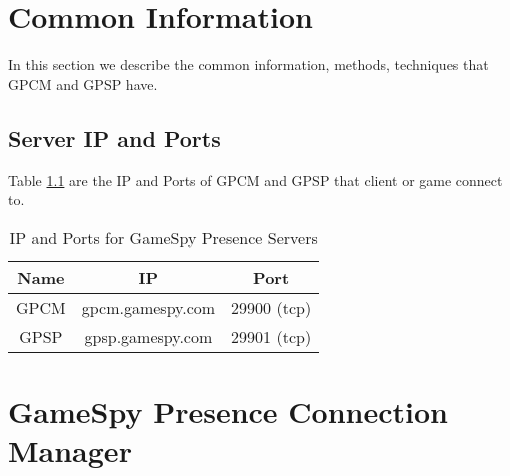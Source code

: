 \documentclass[oneside,titlepage,a4paper]{Definition/retrospy} %
\begin{document}
\chapter{Common Information}
In this section we describe the common information, methods, techniques that GPCM and GPSP have.
\section{Server IP and Ports}
Table \ref{IP and Ports for GameSpy Presence Servers} are the  IP and Ports of GPCM and GPSP that client or game connect to.
\begin{table}[H]
	\centering
	\begin{tabular}{|c|c|c|}
		\hline 
		\textbf{Name}&\textbf{IP}&\textbf{Port}\\ 
		\hline 
		GPCM&gpcm.gamespy.com&29900 (tcp) \\ 
	 	\hline 
		GPSP&gpsp.gamespy.com&29901 (tcp)\\
		\hline
	\end{tabular} 
\caption{IP and Ports for GameSpy Presence Servers}
\label{IP and Ports for GameSpy Presence Servers}

\end{table}

\chapter{GameSpy Presence Connection Manager}
\end{document}
